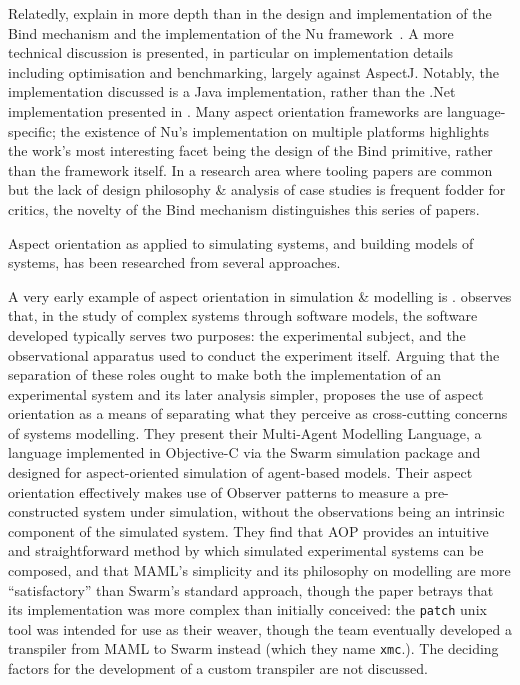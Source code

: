 Relatedly, \citeauthor{dyerNUmasters} explain in more depth than in the design
and implementation of the Bind mechanism and the implementation of the Nu
framework~\cite{dyerNUmasters}. A more technical discussion is presented, in
particular on implementation details including optimisation and benchmarking,
largely against AspectJ. Notably, the implementation discussed is a Java
implementation, rather than the .Net implementation presented in
\cite{rajan2006nu}. Many aspect orientation frameworks are language-specific;
the existence of Nu's implementation on multiple platforms highlights the work's
most interesting facet being the design of the Bind primitive, rather than the
framework itself. In a research area where tooling papers are common but the
lack of design philosophy \& analysis of case studies is frequent fodder for
critics, the novelty of the Bind mechanism distinguishes this series of papers.



Aspect orientation as applied to simulating systems, and building models of
systems, has been researched from several approaches.

A very early example of aspect orientation in simulation \& modelling is
\cite{gulyas1999use}. \citeauthor{gulyas1999use} observes that, in the study of
complex systems through software models, the software developed typically serves
two purposes: the experimental subject, and the observational apparatus used to
conduct the experiment itself. Arguing that the separation of these roles ought
to make both the implementation of an experimental system and its later analysis
simpler, \citeauthor{gulyas1999use} proposes the use of aspect orientation as a
means of separating what they perceive as cross-cutting concerns of systems
modelling. They present their Multi-Agent Modelling Language, a language
implemented in Objective-C via the Swarm simulation package and designed for
aspect-oriented simulation of agent-based models. Their aspect orientation
effectively makes use of Observer patterns to measure a pre-constructed system
under simulation, without the observations being an intrinsic component of the
simulated system. They find that AOP provides an intuitive and straightforward
method by which simulated experimental systems can be composed, and that MAML's
simplicity and its philosophy on modelling are more ``satisfactory'' than
Swarm's standard approach, though the paper betrays that its implementation was
more complex than initially conceived: the \lstinline{patch} unix tool was
intended for use as their weaver, though the team eventually developed a
transpiler from MAML to Swarm instead (which they name \lstinline{xmc}.). The
deciding factors for the development of a custom transpiler are not discussed.

